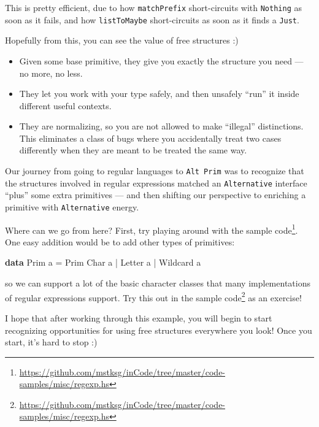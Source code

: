 \documentclass[]{article}
\newenvironment{Shaded}{}{}
\newcommand{\DataTypeTok}[1]{\textcolor[rgb]{0.56,0.13,0.00}{#1}}
\newcommand{\FunctionTok}[1]{\textcolor[rgb]{0.02,0.16,0.49}{#1}}
\newcommand{\KeywordTok}[1]{\textcolor[rgb]{0.00,0.44,0.13}{\textbf{#1}}}
\newcommand{\NormalTok}[1]{#1}
\renewcommand{\href}[2]{#2\footnote{\url{#1}}}
\begin{document}
This is pretty efficient, due to how \texttt{matchPrefix} short-circuits with
\texttt{Nothing} as soon as it fails, and how \texttt{listToMaybe}
short-circuits as soon as it finds a \texttt{Just}.

Hopefully from this, you can see the value of free structures :)

\begin{itemize}
\tightlist
\item
  Given some base primitive, they give you exactly the structure you need --- no
  more, no less.
\item
  They let you work with your type safely, and then unsafely ``run'' it inside
  different useful contexts.
\item
  They are normalizing, so you are not allowed to make ``illegal'' distinctions.
  This eliminates a class of bugs where you accidentally treat two cases
  differently when they are meant to be treated the same way.
\end{itemize}

Our journey from going to regular languages to \texttt{Alt\ Prim} was to
recognize that the structures involved in regular expressions matched an
\texttt{Alternative} interface ``plus'' some extra primitives --- and then
shifting our perspective to enriching a primitive with \texttt{Alternative}
energy.

Where can we go from here? First, try playing around with the
\href{https://github.com/mstksg/inCode/tree/master/code-samples/misc/regexp.hs}{sample
code}. One easy addition would be to add other types of primitives:

\begin{Shaded}
\begin{Highlighting}[]
\KeywordTok{data} \DataTypeTok{Prim}\NormalTok{ a }\FunctionTok{=} \DataTypeTok{Prim} \DataTypeTok{Char}\NormalTok{ a}
            \FunctionTok{|} \DataTypeTok{Letter}\NormalTok{ a}
            \FunctionTok{|} \DataTypeTok{Wildcard}\NormalTok{ a}
\end{Highlighting}
\end{Shaded}

so we can support a lot of the basic character classes that many implementations
of regular expressions support. Try this out in the
\href{https://github.com/mstksg/inCode/tree/master/code-samples/misc/regexp.hs}{sample
code} as an exercise!

I hope that after working through this example, you will begin to start
recognizing opportunities for using free structures everywhere you look! Once
you start, it's hard to stop :)
\end{document}
